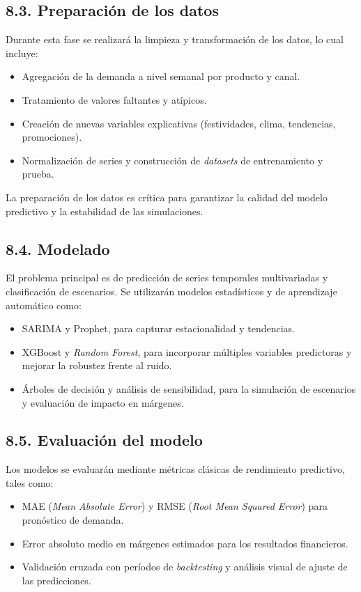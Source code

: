 \documentclass[
11pt, %
]{charter}
\begin{document}
\subsection*{8.3. Preparación de los datos}
Durante esta fase se realizará la limpieza y transformación de los datos, lo cual incluye:
\begin{itemize}
  \item Agregación de la demanda a nivel semanal por producto y canal.
  \item Tratamiento de valores faltantes y atípicos.
  \item Creación de nuevas variables explicativas (festividades, clima, tendencias, promociones).
  \item Normalización de series y construcción de \textit{datasets} de entrenamiento y prueba.
\end{itemize}
La preparación de los datos es crítica para garantizar la calidad del modelo predictivo y la estabilidad de las simulaciones.

\subsection*{8.4. Modelado}
El problema principal es de predicción de series temporales multivariadas y clasificación de escenarios. Se utilizarán modelos estadísticos y de aprendizaje automático como:
\begin{itemize}
  \item SARIMA y Prophet, para capturar estacionalidad y tendencias.
  \item XGBoost y \textit{Random Forest}, para incorporar múltiples variables predictoras y mejorar la robustez frente al ruido.
  \item Árboles de decisión y análisis de sensibilidad, para la simulación de escenarios y evaluación de impacto en márgenes.
\end{itemize}

\subsection*{8.5. Evaluación del modelo}
Los modelos se evaluarán mediante métricas clásicas de rendimiento predictivo, tales como:
\begin{itemize}
  \item MAE (\textit{Mean Absolute Error}) y RMSE (\textit{Root Mean Squared Error}) para pronóstico de demanda.
  \item Error absoluto medio en márgenes estimados para los resultados financieros.
  \item Validación cruzada con períodos de \textit{backtesting} y análisis visual de ajuste de las predicciones.
\end{itemize}
\end{document}
